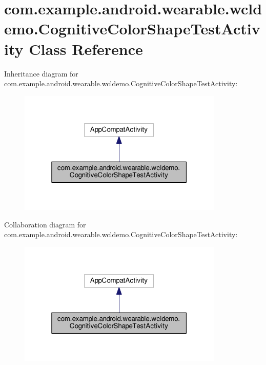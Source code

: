 \hypertarget{classcom_1_1example_1_1android_1_1wearable_1_1wcldemo_1_1CognitiveColorShapeTestActivity}{}\section{com.\+example.\+android.\+wearable.\+wcldemo.\+Cognitive\+Color\+Shape\+Test\+Activity Class Reference}
\label{classcom_1_1example_1_1android_1_1wearable_1_1wcldemo_1_1CognitiveColorShapeTestActivity}


Inheritance diagram for com.\+example.\+android.\+wearable.\+wcldemo.\+Cognitive\+Color\+Shape\+Test\+Activity\+:
\nopagebreak
\begin{figure}[H]
\begin{center}
\leavevmode
\includegraphics[width=277pt]{d5/d65/classcom_1_1example_1_1android_1_1wearable_1_1wcldemo_1_1CognitiveColorShapeTestActivity__inherit__graph}
\end{center}
\end{figure}


Collaboration diagram for com.\+example.\+android.\+wearable.\+wcldemo.\+Cognitive\+Color\+Shape\+Test\+Activity\+:
\nopagebreak
\begin{figure}[H]
\begin{center}
\leavevmode
\includegraphics[width=277pt]{d8/d9b/classcom_1_1example_1_1android_1_1wearable_1_1wcldemo_1_1CognitiveColorShapeTestActivity__coll__graph}
\end{center}
\end{figure}
